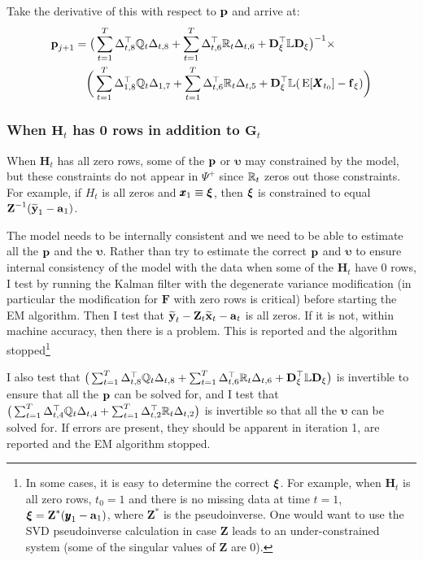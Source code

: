 \documentclass[]{article}
\def\uupsilon{\pmb{\upsilon}}
\def\xixi{\mbox{\boldmath $\xi$}}
\def\LAMm{\mathbb{L}}
\def\XI{\mbox{\boldmath $\Xi$}}
\def\DD{\mbox{$\mathbf D$}}	\def\dd{\mbox{$\mathbf d$}}
\def\E{\,\textup{\textrm{E}}}
\def\FF{\mbox{$\mathbf F$}} \def\ff{\mbox{$\mathbf f$}}
\def\GG{\mbox{$\mathbf G$}}	\def\gg{\mbox{$\mathbf g$}}
\def\HH{\mbox{$\mathbf H$}}	\def\hh{\mbox{$\mathbf h$}}
\def\XX{\mbox{$\pmb{X}$}}	\def\xx{\mbox{$\pmb{x}$}}
\def\ZZ{\mbox{$\mathbf Z$}}	\def\zz{\mbox{$\mathbf z$}}	\def\Zb{\mbox{$\mathbf M$}} \def\Za{\mbox{$\mathbf N$}} \def\Zm{\XI}
\def\hatxt{\widetilde{\mbox{$\mathbf x$}}_t}
\def\hatyt{\widetilde{\mbox{$\mathbf y$}}_t}
\def\hatyone{\widetilde{\mbox{$\mathbf y$}}_1}
\begin{document}
Take the derivative of this with respect to $\mbox{$\mathbf p$}$ and arrive at:
\begin{equation}
\begin{split}
\label{eq:p.degen.update.x0.0.a.fixed}
\pp_{j+1} &= \big(\sum_{t=1}^T\Delta_{t,8}^\top\Qm_t\Delta_{t,8} + \sum_{t=1}^T\Delta_{t,6}^\top\Rm_t\Delta_{t,6} + \DD_\xi^\top\LAMm\DD_\xi\big)^{-1} \times\\
&\quad \bigg(\sum_{t=1}^T\Delta_{1,8}^\top\Qm_t\Delta_{1,7} + \sum_{t=1}^T \Delta_{t,6}^\top\Rm_t\Delta_{t,5} + \DD_\xi^\top\LAMm(\E[\XX_{t_0}] - \ff_\xi)\bigg)
\end{split}
\end{equation}

\subsubsection{When $\HH_t$ has 0 rows in addition to $\GG_t$}
When $\HH_t$ has all zero rows, some of the $\mbox{$\mathbf p$}$ or $\uupsilon$ may constrained by the model, but these constraints do not appear in $\Psi^+$ since $\mathbb{R}_t$ zeros out those constraints.  For example, if $H_t$ is all zeros and $\xx_1 \equiv \xixi$, then $\xixi$ is constrained to equal $\ZZ^{-1}(\hatyone-\aa_1)$.    

The model needs to be internally consistent and we need to be able to estimate all the $\mbox{$\mathbf p$}$ and the $\uupsilon$.  Rather than try to estimate the correct $\mbox{$\mathbf p$}$ and $\uupsilon$ to ensure internal consistency of the model with the data when some of the $\HH_t$ have 0 rows, I test by running the Kalman filter with the degenerate variance modification (in particular the modification for $\FF$ with zero rows is critical) before starting the EM algorithm.  Then I test that $\hatyt-\ZZ_t\hatxt-\aa_t$ is all zeros.  If it is not, within machine accuracy, then there is a problem.  This is reported and the algorithm stopped\footnote{In some cases, it is easy to determine the correct $\xixi$.  For example, when $\HH_t$ is all zero rows, $t_0=1$ and there is no missing data at time $t=1$, $\xixi=\ZZ^*(\yy_1-\aa_1)$, where $\ZZ^*$ is the pseudoinverse. One would want to use the SVD pseudoinverse calculation in case $\ZZ$ leads to an under-constrained system (some of the singular values of $\ZZ$ are 0). }  

I also test that $\big(\sum_{t=1}^T\Delta_{t,8}^\top\Qm_t\Delta_{t,8} + \sum_{t=1}^T\Delta_{t,6}^\top\Rm_t\Delta_{t,6} + \DD_\xi^\top\LAMm\DD_\xi\big)$ is invertible to ensure that all the $\mbox{$\mathbf p$}$ can be solved for, and I test that $\big(\sum_{t=1}^T\Delta_{t,4}^\top\mathbb{Q}_t\Delta_{t,4} + \sum_{t=1}^T\Delta_{t,2}^\top\mathbb{R}_t\Delta_{t,2}\big)$ is invertible so that all the $\uupsilon$ can be solved for.  If errors are present, they should be apparent in iteration 1, are reported and the EM algorithm stopped.
\end{document}

